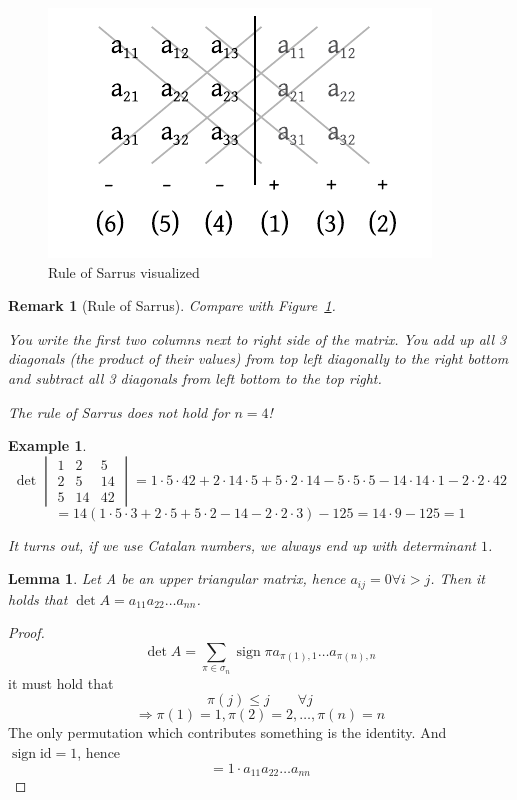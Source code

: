 \documentclass[a4paper,landscape,twocolumn]{article}
\newtheorem{ex}{Example}
\newtheorem{rem}{Remark}
\newtheorem{lemma}{Lemma}
\DeclareMathOperator\sign{sign}
\begin{document}
\begin{figure}[!h]
  \begin{center}
    \includegraphics{img/rule_of_sarrus.pdf}
    \caption{Rule of Sarrus visualized}
    \label{img:sarrus}
  \end{center}
\end{figure}

\begin{rem}[Rule of Sarrus]
  Compare with Figure~\ref{img:sarrus}.

  You write the first two columns next to right side of the matrix.
  You add up all 3 diagonals (the product of their values) from top left diagonally to the right bottom
  and subtract all 3 diagonals from left bottom to the top right.

  The rule of Sarrus does not hold for $n=4$!
\end{rem}

\begin{ex}
  \[
    \det\begin{vmatrix} 1 & 2 & 5 \\ 2 & 5 & 14 \\ 5 & 14 & 42 \end{vmatrix}
      = 1 \cdot 5 \cdot 42 + 2 \cdot 14 \cdot 5 + 5 \cdot 2 \cdot 14
      - 5 \cdot 5 \cdot 5 - 14 \cdot 14 \cdot 1 - 2 \cdot 2 \cdot 42
  \] \[
    = 14 (1 \cdot 5 \cdot 3 + 2 \cdot 5 + 5 \cdot 2 - 14 - 2 \cdot 2 \cdot 3) - 125
    = 14 \cdot 9 - 125 = 1
  \]

  It turns out, if we use Catalan numbers, we always end up with determinant $1$.
\end{ex}

\begin{lemma}
  Let A be an upper triangular matrix, hence $a_{ij} = 0 \forall i > j$.
  Then it holds that $\det{A} = a_{11} a_{22} \ldots a_{nn}$.
\end{lemma}
\begin{proof}
  \[ \det{A} = \sum_{\pi \in \sigma_n} \sign{\pi} a_{\pi(1),1} \ldots a_{\pi(n),n} \]
  it must hold that
  \[ \pi(j) \leq j \qquad \forall j \]
  \[ \Rightarrow \pi(1) = 1, \pi(2) = 2, \ldots, \pi(n) = n \]
  The only permutation which contributes something is the identity.
  And $\sign{\text{id}} = 1$, hence
  \[ = 1 \cdot a_{11} a_{22} \ldots a_{nn} \]
\end{proof}
\end{document}
